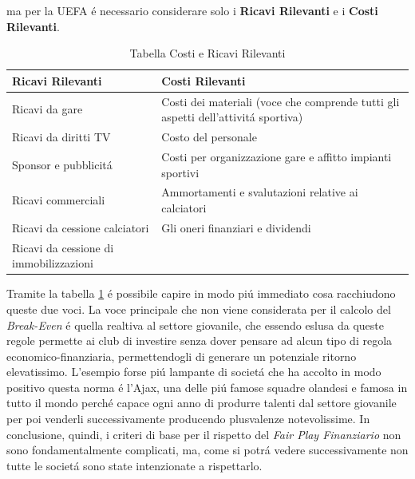 \documentclass[
    corpo=12pt,
    oneside,
    evenboxes,
    tipotesi=triennale,
    stile=classica,
    oldstyle,
    autoretitolo,
    greek,
]{toptesi}
\begin{document}
\begin{interlinea}{1.5}
ma per la UEFA \'e necessario considerare solo i \textbf{Ricavi Rilevanti} e i \textbf{Costi Rilevanti}.
\newpage
\begin{table}
    \begin{tabularx}{\textwidth}{XX}
        \toprule
        \textbf{Ricavi Rilevanti} & \textbf{Costi Rilevanti} \\
        \midrule
        Ricavi da gare & Costi dei materiali (voce che comprende tutti gli aspetti dell'attivit\'a sportiva) \\
        \midrule
        Ricavi da diritti TV & Costo del personale \\
        \midrule
        Sponsor e pubblicit\'a & Costi per organizzazione gare e affitto impianti sportivi \\
        \midrule
        Ricavi commerciali & Ammortamenti e svalutazioni relative ai calciatori \\
        \midrule
        Ricavi da cessione calciatori & Gli oneri finanziari e dividendi \\
        \midrule
        Ricavi da cessione di immobilizzazioni & \\
        \bottomrule
    \end{tabularx}
    \caption{Tabella Costi e Ricavi Rilevanti}
    \label{tabella_ric_costi_ril}
\end{table} 
Tramite la tabella \ref{tabella_ric_costi_ril} \'e possibile capire in modo pi\'u immediato cosa racchiudono queste due voci. La voce principale 
che non viene considerata per il calcolo del \emph{Break-Even} \'e quella realtiva al settore giovanile, che essendo eslusa da queste regole
permette ai club di investire senza dover pensare ad alcun tipo di regola economico-finanziaria, permettendogli di generare un potenziale ritorno
elevatissimo. L'esempio forse pi\'u lampante di societ\'a che ha accolto in modo positivo questa norma \'e l'Ajax, una delle pi\'u famose
squadre olandesi e famosa in tutto il mondo perch\'e capace ogni anno di produrre talenti dal settore giovanile per poi venderli successivamente
producendo plusvalenze notevolissime.\newline
In conclusione, quindi, i criteri di base per il rispetto del \emph{Fair Play Finanziario} non sono fondamentalmente complicati, ma, come 
si potr\'a vedere successivamente non tutte le societ\'a sono state intenzionate a rispettarlo.

\end{interlinea}
\end{document}
